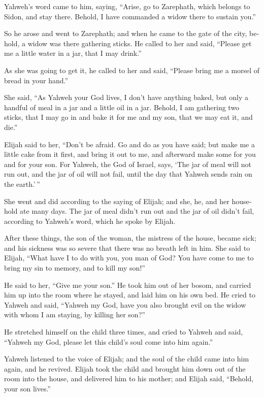 \begin{paracol}{2}
\begin{otherlanguage}{english}
 Yahweh's word came to him, saying, 
``Arise, go to Zarephath, which belongs to Sidon, and stay there.
Behold, I have commanded a widow there to sustain you.''

 So he arose and went to Zarephath; and when he came to
the gate of the city, behold, a widow was there gathering sticks. He
called to her and said, ``Please get me a little water in a jar, that I
may drink.''

 As she was going to get it, he called to her and said,
``Please bring me a morsel of bread in your hand.''

 She said, ``As Yahweh your God lives, I don't have
anything baked, but only a handful of meal in a jar and a little oil in
a jar. Behold, I am gathering two sticks, that I may go in and bake it
for me and my son, that we may eat it, and die.''

 Elijah said to her, ``Don't be afraid. Go and do as you
have said; but make me a little cake from it first, and bring it out to
me, and afterward make some for you and for your son. 
For Yahweh, the God of Israel, says, `The jar of meal will not run out,
and the jar of oil will not fail, until the day that Yahweh sends rain
on the earth.'\,''

 She went and did according to the saying of Elijah; and
she, he, and her household ate many days.  The jar of
meal didn't run out and the jar of oil didn't fail, according to
Yahweh's word, which he spoke by Elijah.

 After these things, the son of the woman, the mistress
of the house, became sick; and his sickness was so severe that there was
no breath left in him.  She said to Elijah, ``What have I
to do with you, you man of God? You have come to me to bring my sin to
memory, and to kill my son!''

 He said to her, ``Give me your son.'' He took him out of
her bosom, and carried him up into the room where he stayed, and laid
him on his own bed.  He cried to Yahweh and said,
``Yahweh my God, have you also brought evil on the widow with whom I am
staying, by killing her son?''

 He stretched himself on the child three times, and cried
to Yahweh and said, ``Yahweh my God, please let this child's soul come
into him again.''

 Yahweh listened to the voice of Elijah; and the soul of
the child came into him again, and he revived.  Elijah
took the child and brought him down out of the room into the house, and
delivered him to his mother; and Elijah said, ``Behold, your son
lives.''


\end{otherlanguage}
\end{paracol}

